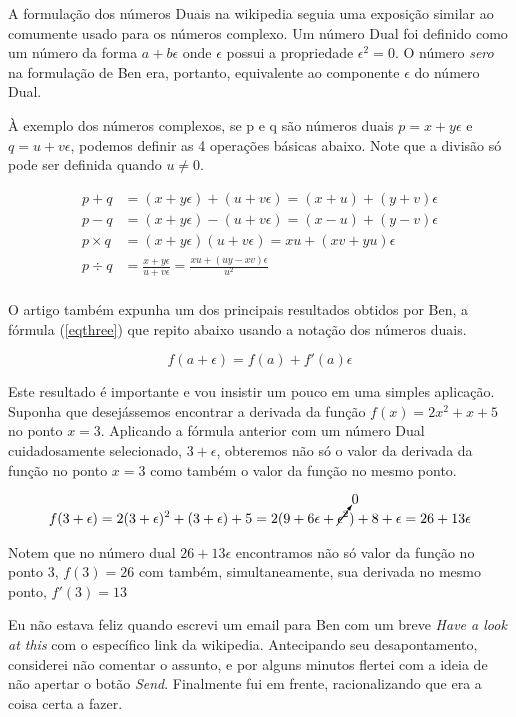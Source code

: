 \documentclass{article}
\begin{document}
A formulação dos números Duais na wikipedia seguia uma exposição similar ao comumente usado para os números complexo. Um número Dual foi definido como um número da forma \( a + b \epsilon \) onde \(\epsilon\) possui a propriedade \(\epsilon^2 = 0\). O número \textit{sero} na formulação de Ben era, portanto, equivalente ao componente \(\epsilon\) do número Dual.

À exemplo dos números complexos, se p e q são números duais \(p=x+y\epsilon\) e \(q=u+v\epsilon\), podemos definir as 4 operações básicas abaixo. Note que a divisão só pode ser definida quando \(u \neq 0\).

\begin{align*} 
  p+q &= (x+y\epsilon)+(u+v\epsilon)=(x+u)+(y+v)\epsilon \\
  p-q &= (x+y\epsilon)-(u+v\epsilon)=(x-u)+(y-v)\epsilon \\
  p \times q  &= (x+y\epsilon)(u+v\epsilon) = xu + (xv + yu)\epsilon \\
  p \div q &= \frac{x+y\epsilon}{u+v\epsilon} = \frac{xu +(uy-xv)\epsilon}{u^2} \\
\end{align*}

O artigo também expunha um dos principais resultados obtidos por Ben, a fórmula (\ref{eqthree}) que repito abaixo usando a notação dos números duais.

\[
    f(a+ \epsilon) = f(a) + f'(a)\epsilon
\]

Este resultado é importante e vou insistir um pouco em uma simples aplicação. Suponha que desejássemos encontrar a derivada da função \( f(x) =  2x^2 + x + 5 \) no ponto \(x = 3 \). Aplicando a fórmula anterior com  um número Dual cuidadosamente selecionado, \(3+\epsilon\), obteremos não só o valor da derivada da função no ponto \(x = 3\) como também o valor da função no mesmo ponto.

\begin{align*}
 f(3 + \epsilon) &= 2(3+ \epsilon)^2 + (3 + \epsilon) + 5  = 2(9 + 6\epsilon + \cancelto{0}{\epsilon^2}) + 8 + \epsilon = 26 + 13\epsilon \\
\end{align*}

Notem que no número dual \(26 + 13\epsilon \) encontramos não só valor da função no ponto 3, \(f(3) = 26\) com também, simultaneamente, sua derivada no mesmo ponto, \(f'(3) = 13 \)

Eu não estava feliz quando escrevi um email para Ben com um breve \textit{Have a look at this} com o específico link da wikipedia. Antecipando seu desapontamento, considerei não comentar o assunto, e por alguns minutos flertei com a ideia de não apertar o botão \textit{Send}. Finalmente fui em frente, racionalizando que era a coisa certa a fazer.
\end{document}
